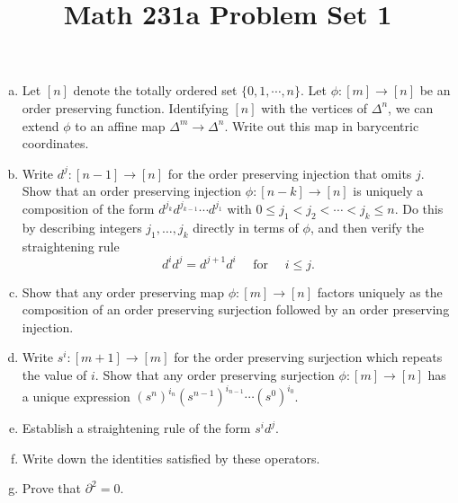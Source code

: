 \documentclass[11pt,letterpaper]{article}
\title{\textbf{Math 231a Problem Set 1}}
\begin{document}
\maketitle

\begin{problem}\noindent
    \begin{enumerate}[(a)]
        \item Let $[n]$ denote the totally ordered set $\{0,1,\cdots,n\}$. Let $\phi : [m] \to [n]$ be an order preserving function. Identifying $[n]$ with the vertices of $\Delta^n$, we can extend $\phi$ to an affine map $\Delta^m\to\Delta^n$. Write out this map in barycentric coordinates.
        \item Write $d^j : [n-1] \to [n]$ for the order preserving injection that omits $j$. Show that an order preserving injection $\phi : [n-k] \to [n]$ is uniquely a composition of the form $d^{j_k}d^{j_{k-1}}\cdots d^{j_1}$ with $0\leq j_1 < j_2 < \cdots < j_k \leq n$. Do this by describing integers $j_1,\ldots,j_k$ directly in terms of $\phi$, and then verify the straightening rule
        \[
            d^i d^j = d^{j+1}d^i\quad\textrm{ for }\quad i\leq j    
        .\] 
        \item Show that any order preserving map $\phi : [m] \to [n]$ factors uniquely as the composition of an order preserving surjection followed by an order preserving injection.
        \item Write $s^i : [m+1] \to [m]$ for the order preserving surjection which repeats the value of $i$. Show that any order preserving surjection $\phi : [m] \to [n]$ has a unique expression $(s^n)^{i_n}(s^{n-1})^{i_{n-1}}\cdots (s^0)^{i_0}$.
        \item Establish a straightening rule of the form $s^id^j$.
        \item Write down the identities satisfied by these operators.
        \item Prove that $\partial^2=0$.
    \end{enumerate}
\end{problem}
\end{document}
